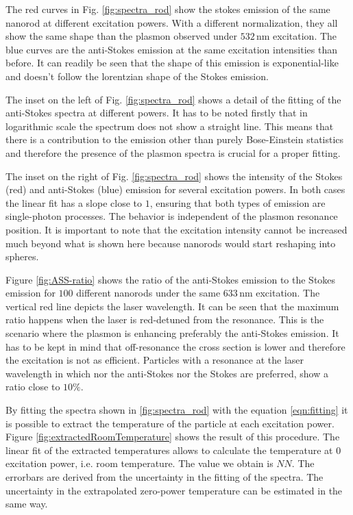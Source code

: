 \documentclass[journal=nalefd,manuscript=letter]{achemso}
\newcommand{\nm}{\ensuremath{\,\textrm{nm}}}
\begin{document}
The red curves in Fig. \ref{fig:spectra_rod} show the stokes emission of the
same nanorod at different excitation powers. With a different normalization,
they all show the same shape than the plasmon observed under $532\nm$
excitation. The blue curves are the anti-Stokes emission at the same excitation
intensities than before. It can readily be seen that the shape of this emission
is exponential-like and doesn't follow the lorentzian shape of the Stokes
emission. 

The inset on the left of Fig. \ref{fig:spectra_rod} shows a detail of the
fitting of the anti-Stokes spectra at different powers. It has to be noted
firstly that in logarithmic scale the spectrum does not show a straight line.
This means that there is a contribution to the emission other than purely
Bose-Einstein statistics and therefore the presence of the plasmon spectra is
crucial for a proper fitting. 

The inset on the right of Fig. \ref{fig:spectra_rod} shows the intensity of the
Stokes (red) and anti-Stokes (blue) emission for several excitation powers. In
both cases the linear fit has a slope close to $1$, ensuring that both types of
emission are single-photon processes. The behavior is independent of the
plasmon resonance position. It is important to note that the excitation
intensity cannot be increased much beyond what is shown here because nanorods
would start reshaping into spheres. 

Figure \ref{fig:ASS-ratio} shows the ratio of the anti-Stokes emission to the
Stokes emission for $100$ different nanorods under the same $633\nm$ excitation.
The vertical red line depicts the laser wavelength. It can be seen that the
maximum ratio happens when the laser is red-detuned from the resonance. This is
the scenario where the plasmon is enhancing preferably the anti-Stokes
emission. It has to be kept in mind that off-resonance the cross section is
lower and therefore the excitation is not as efficient. Particles with a
resonance at the laser wavelength in which nor the anti-Stokes nor the Stokes
are preferred, show a ratio close to $10\%$. 

By fitting the spectra shown in \ref{fig:spectra_rod} with the equation
\ref{eqn:fitting} it is possible to extract the temperature of the particle at
each excitation power. Figure \ref{fig:extractedRoomTemperature} shows the
result of this procedure. The linear fit of the extracted temperatures allows to
calculate the temperature at $0$ excitation power, i.e. room temperature. The
value we obtain is $NN$. The errorbars are derived from the uncertainty in the
fitting of the spectra. The uncertainty in the extrapolated zero-power
temperature can be estimated in the same way.
\end{document}
